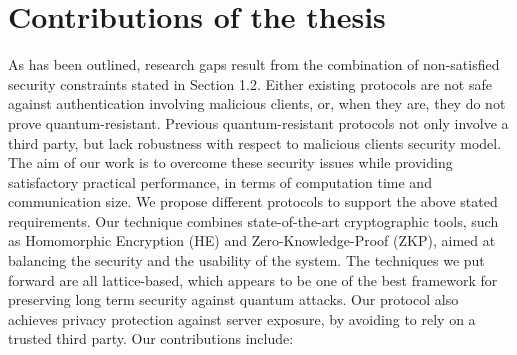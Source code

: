 \section{Contributions of the thesis}
\label{sec:thesisContributions}
As has been outlined, research gaps result from the combination of non-satisfied
security constraints stated in Section 1.2. Either existing protocols are not
safe against authentication involving malicious clients, or, when they are, they
do not prove quantum-resistant. Previous quantum-resistant protocols not only
involve a third party, but lack robustness with respect to malicious clients
security model. The aim of our work is to overcome these security issues while
providing satisfactory practical performance, in terms of computation time and
communication size.  We propose different protocols to support the above stated
requirements. Our technique combines state-of-the-art cryptographic tools, such
as Homomorphic Encryption (HE) and Zero-Knowledge-Proof (ZKP), aimed at
balancing the security and the usability of the system. The techniques we put
forward are all lattice-based, which appears to be one of the best framework for
preserving long term security against quantum attacks. Our protocol also
achieves privacy protection against server exposure, by avoiding to rely on a
trusted third party. Our contributions include:
